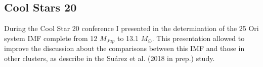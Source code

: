 \documentclass[12pt]{article}
\begin{document}
\subsection{Cool Stars 20}
\label{sec:CS20}
During the Cool Star 20 conference I presented in \citet{Suarez2018} the determination of the 25 Ori system IMF complete from 12 $M_{Jup}$ to 13.1 $M_\odot$. This presentation allowed to improve the discussion about the comparisons between this IMF and those in other clusters, as describe in the Su\'arez et al. (2018 in prep.) study.

\setlength{\bibsep}{0pt plus 0.4ex}

%
%
%
%
%
%
%
%
%
%
%
%
%
%
%
\end{document}
